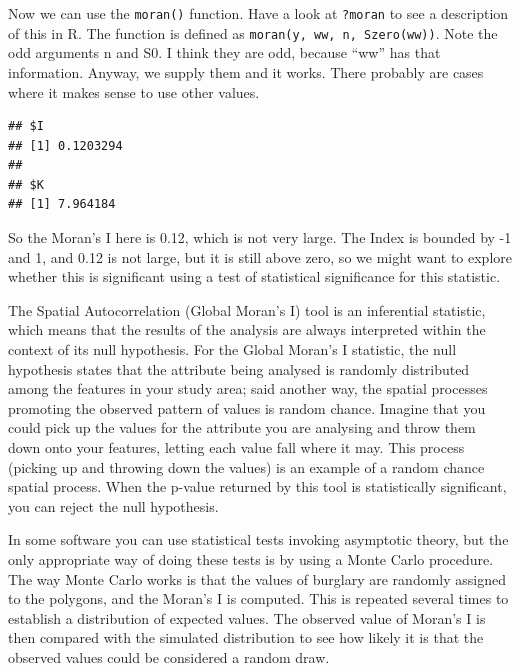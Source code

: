 \documentclass[]{book}
\newenvironment{Shaded}{\begin{snugshade}}{\end{snugshade}}
\newcommand{\DataTypeTok}[1]{\textcolor[rgb]{0.13,0.29,0.53}{#1}}
\newcommand{\KeywordTok}[1]{\textcolor[rgb]{0.13,0.29,0.53}{\textbf{#1}}}
\newcommand{\NormalTok}[1]{#1}
\newcommand{\OperatorTok}[1]{\textcolor[rgb]{0.81,0.36,0.00}{\textbf{#1}}}
\begin{document}
Now we can use the \texttt{moran()} function. Have a look at \texttt{?moran} to see a description of this in R. The function is defined as \texttt{moran(y,\ ww,\ n,\ Szero(ww))}. Note the odd arguments n and S0. I think they are odd, because ``ww'' has that information. Anyway, we supply them and it works. There probably are cases where it makes sense to use other values.

\begin{Shaded}
\end{Shaded}

\begin{verbatim}
## $I
## [1] 0.1203294
## 
## $K
## [1] 7.964184
\end{verbatim}

So the Moran's I here is 0.12, which is not very large. The Index is bounded by -1 and 1, and 0.12 is not large, but it is still above zero, so we might want to explore whether this is significant using a test of statistical significance for this statistic.

The Spatial Autocorrelation (Global Moran's I) tool is an inferential statistic, which means that the results of the analysis are always interpreted within the context of its null hypothesis. For the Global Moran's I statistic, the null hypothesis states that the attribute being analysed is randomly distributed among the features in your study area; said another way, the spatial processes promoting the observed pattern of values is random chance. Imagine that you could pick up the values for the attribute you are analysing and throw them down onto your features, letting each value fall where it may. This process (picking up and throwing down the values) is an example of a random chance spatial process. When the p-value returned by this tool is statistically significant, you can reject the null hypothesis.

In some software you can use statistical tests invoking asymptotic theory, but the only appropriate way of doing these tests is by using a Monte Carlo procedure. The way Monte Carlo works is that the values of burglary are randomly assigned to the polygons, and the Moran's I is computed. This is repeated several times to establish a distribution of expected values. The observed value of Moran's I is then compared with the simulated distribution to see how likely it is that the observed values could be considered a random draw.
\end{document}
